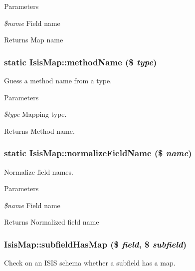 \begin{DoxyParams}{Parameters}
\item[{\em \$name}]Field name\end{DoxyParams}
\begin{DoxyReturn}{Returns}
Map name 
\end{DoxyReturn}
\hypertarget{classIsisMap_af80aedabfeca623a9022dfcbc95d591c}{
\subsubsection[{methodName}]{\setlength{\rightskip}{0pt plus 5cm}static IsisMap::methodName (\$ {\em type})}}
\label{classIsisMap_af80aedabfeca623a9022dfcbc95d591c}
Guess a method name from a type.


\begin{DoxyParams}{Parameters}
\item[{\em \$type}]Mapping type.\end{DoxyParams}
\begin{DoxyReturn}{Returns}
Method name. 
\end{DoxyReturn}
\hypertarget{classIsisMap_ae2abf0591a4862f537fa23537ffca705}{
\subsubsection[{normalizeFieldName}]{\setlength{\rightskip}{0pt plus 5cm}static IsisMap::normalizeFieldName (\$ {\em name})}}
\label{classIsisMap_ae2abf0591a4862f537fa23537ffca705}
Normalize field names.


\begin{DoxyParams}{Parameters}
\item[{\em \$name}]Field name\end{DoxyParams}
\begin{DoxyReturn}{Returns}
Normalized field name 
\end{DoxyReturn}
\hypertarget{classIsisMap_ab5493af644e529c11a3c3e6edc37c3b9}{
\subsubsection[{subfieldHasMap}]{\setlength{\rightskip}{0pt plus 5cm}IsisMap::subfieldHasMap (\$ {\em field}, \/  \$ {\em subfield})}}
\label{classIsisMap_ab5493af644e529c11a3c3e6edc37c3b9}
Check on an ISIS schema whether a subfield has a map.


